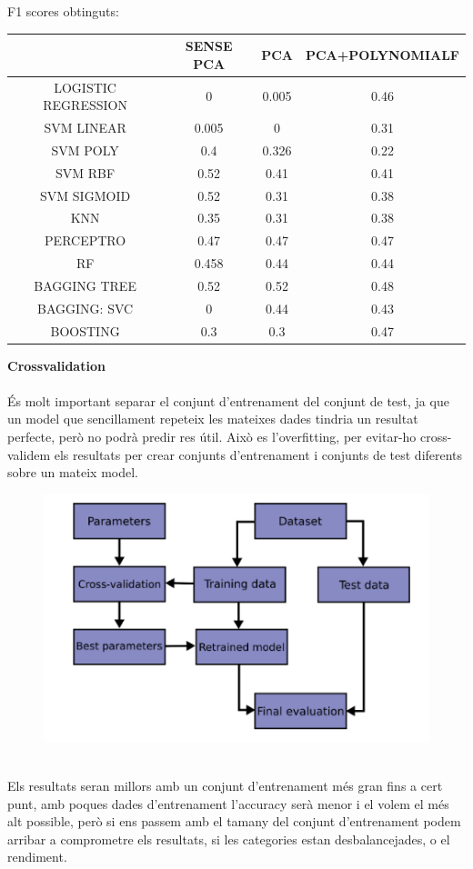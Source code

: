 \documentclass{article}
\begin{document}
F1 scores obtinguts:\\
\begin{center}
	\begin{tabular}{|c|c|c|c|}\hline
		&SENSE PCA&		PCA&		PCA+POLYNOMIALF\\ \hline
		LOGISTIC REGRESSION& 0  & 0.005	& 0.46\\ \hline
		SVM	LINEAR& 0.005	& 0		& 0.31\\ \hline
		SVM POLY& 0.4	& 0.326	& 0.22\\ \hline
		SVM RBF& 0.52	&0.41	& 0.41\\ \hline
		SVM SIGMOID& 0.52	& 0.31	& 0.38\\ \hline
		KNN& 0.35		& 0.31	& 0.38\\ \hline
		PERCEPTRO& 0.47		& 0.47	& 0.47\\ \hline
		RF& 0.458		& 0.44	& 0.44\\ \hline
		BAGGING TREE &0.52	&0.52	& 0.48\\ \hline
		BAGGING: SVC & 0	& 0.44	&0.43\\ \hline
		BOOSTING& 0.3 & 0.3 & 0.47\\ \hline
	\end{tabular}
\end{center}
	\textbf{Crossvalidation}\\
	\\
	És molt important separar el conjunt d'entrenament del conjunt de test, ja que un model que sencillament repeteix les mateixes dades tindria un resultat perfecte, però no podrà predir res útil. Això es l'overfitting, per evitar-ho cross-validem els resultats per crear conjunts d'entrenament i conjunts de test diferents sobre un mateix model.\\
	\begin{figure}[!h]
		\centering
		\includegraphics[width=0.4\linewidth]{../images/crossvalidation}
		\caption*{}
		\label{fig:crossvalidation}
	\end{figure}\\
	Els resultats seran millors amb un conjunt d'entrenament més gran fins a cert punt, amb poques dades d'entrenament l'accuracy serà menor i el volem el més alt possible, però si ens passem amb el tamany del conjunt d'entrenament podem arribar a comprometre els resultats, si les categories estan desbalancejades, o el rendiment.\\
\end{document}
